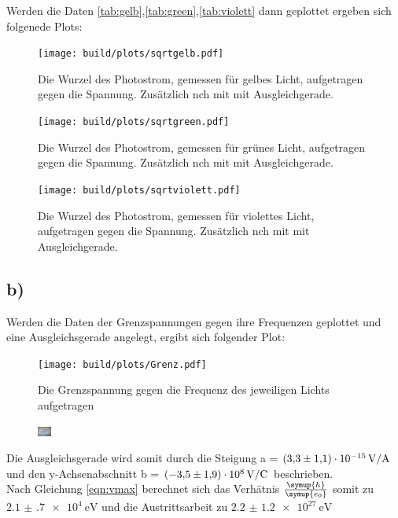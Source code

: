     \noindent
    Werden die Daten \ref{tab:gelb},\ref{tab:green},\ref{tab:violett} dann geplottet ergeben sich folgenede Plots:
    \noindent

    \begin{figure}[H]
        \centering
        \texttt{[image: build/plots/sqrtgelb.pdf]}
        \caption{Die Wurzel des Photostrom, gemessen für gelbes Licht, aufgetragen gegen die Spannung. Zusätzlich nch mit mit Ausgleichgerade.}
        \label{img:sqrtgelb}
    \end{figure}

    \begin{figure}[H]
        \centering
        \texttt{[image: build/plots/sqrtgreen.pdf]}
        \caption{Die Wurzel des Photostrom, gemessen für grünes Licht, aufgetragen gegen die Spannung. Zusätzlich nch mit mit Ausgleichgerade.}
        \label{img:sqrtgruen}
    \end{figure}

    \begin{figure}[H]
        \centering
        \texttt{[image: build/plots/sqrtviolett.pdf]}
        \caption{Die Wurzel des Photostrom, gemessen für violettes Licht, aufgetragen gegen die Spannung. Zusätzlich nch mit mit Ausgleichgerade.}
        \label{img:sqrtviolett}
    \end{figure}
\newpage
\subsection{b)}

    \noindent
    Werden die Daten der Grenzspannungen gegen ihre Frequenzen geplottet und eine Ausgleichsgerade angelegt, ergibt sich folgender Plot:
    \noindent

    \begin{figure}[H]
        \centering
        \texttt{[image: build/plots/Grenz.pdf]}
        \caption{Die Grenzspannung gegen die Frequenz des jeweiligen Lichts aufgetragen}
        \label{img:gegen}
    \end{figure}

    \begin{figure}[H]
        \centering
        \includegraphics[width=0.04\textwidth]{latex/images/meme.PNG}
    \end{figure}

    \noindent
    Die Ausgleichsgerade wird somit durch die Steigung a = $\SI{3.3 (11)e-15}{\volt\per\ampere}$ und den y-Achsenabschnitt 
    b = $\SI{-3.5 (19)e8}{\volt\per\coulomb}$ beschrieben.\\
    Nach Gleichung \ref{eqn:vmax} berechnet sich das Verhätnis $\frac{\symup{h}}{\symup{e_0}}$ somit zu $\SI{2.1(7)e4}{\electronvolt}$ und die 
    Austrittsarbeit zu $\SI{2.2(12)e27}{\electronvolt}$
    \noindent

